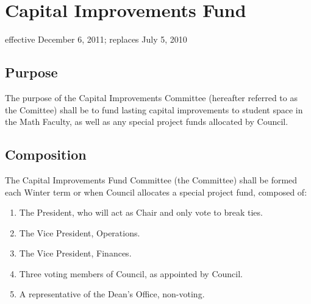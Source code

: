 \section{Capital Improvements Fund}
effective December 6, 2011; replaces July 5, 2010

\subsection{Purpose}
The purpose of the Capital Improvements Committee (hereafter referred to as the Comittee) shall be to fund lasting capital improvements to student space in the Math Faculty, as well as any special project funds allocated by Council.

\subsection{Composition}
The Capital Improvements Fund Committee (the Committee) shall be formed each Winter term or when Council allocates a special project fund, composed of:
\begin{enumerate}
\item The President, who will act as Chair and only vote to break ties.
\item The Vice President, Operations.
\item The Vice President, Finances.
\item Three voting members of Council, as appointed by Council.
\item A representative of the Dean's Office, non-voting.
\end{enumerate}


